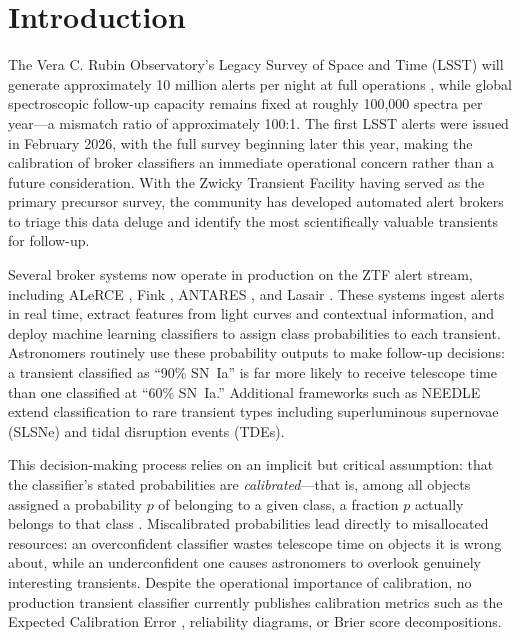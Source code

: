 \documentclass[twocolumn]{aastex631}
\begin{document}
\begin{abstract}
\end{abstract}


\section{Introduction} \label{sec:intro}

The Vera C. Rubin Observatory's Legacy Survey of Space and Time (LSST) will generate approximately 10 million alerts per night at full operations \citep{ivezic2019}, while global spectroscopic follow-up capacity remains fixed at roughly 100,000 spectra per year---a mismatch ratio of approximately 100:1. The first LSST alerts were issued in February 2026, with the full survey beginning later this year, making the calibration of broker classifiers an immediate operational concern rather than a future consideration. With the Zwicky Transient Facility \citep[ZTF;][]{bellm2019} having served as the primary precursor survey, the community has developed automated alert brokers to triage this data deluge and identify the most scientifically valuable transients for follow-up.

Several broker systems now operate in production on the ZTF alert stream, including ALeRCE \citep{forster2021}, Fink \citep{moller2021}, ANTARES \citep{narayan2018}, and Lasair \citep{smith2019}. These systems ingest alerts in real time, extract features from light curves and contextual information, and deploy machine learning classifiers to assign class probabilities to each transient. Astronomers routinely use these probability outputs to make follow-up decisions: a transient classified as ``90\% SN~Ia'' is far more likely to receive telescope time than one classified at ``60\% SN~Ia.'' Additional frameworks such as NEEDLE \citep{sheng2024} extend classification to rare transient types including superluminous supernovae (SLSNe) and tidal disruption events (TDEs).

This decision-making process relies on an implicit but critical assumption: that the classifier's stated probabilities are \emph{calibrated}---that is, among all objects assigned a probability $p$ of belonging to a given class, a fraction $p$ actually belongs to that class \citep{dawid1982}. Miscalibrated probabilities lead directly to misallocated resources: an overconfident classifier wastes telescope time on objects it is wrong about, while an underconfident one causes astronomers to overlook genuinely interesting transients. Despite the operational importance of calibration, no production transient classifier currently publishes calibration metrics such as the Expected Calibration Error \citep[ECE;][]{naeini2015}, reliability diagrams, or Brier score decompositions.
\end{document}
